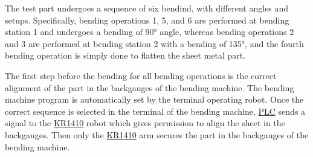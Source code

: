 
The test part undergoes a sequence of six bendind, with different angles and setups. Specifically, bending operations 1, 5, and 6 are performed at bending station 1 and undergoes a bending of 90° angle, whereas bending operations 2 and 3 are performed at bending station 2 with a bending of 135°, and the fourth bending operation is simply done to flatten the sheet metal part.

The first step before the bending for all bending operations is the correct alignment of the part in the backgauges of the bending machine. The bending machine program is automatically set by the terminal operating robot. Once the correct sequence is selected in the terminal of the bending machine, \hyperref[acro:PLC]{PLC} sends a signal to the \hyperref[acro:KR]{KR1410} robot which gives permission to align the sheet in the backgauges.
Then only the \hyperref[acro:KR]{KR1410} arm secures the part in the backgauges of the bending machine.

